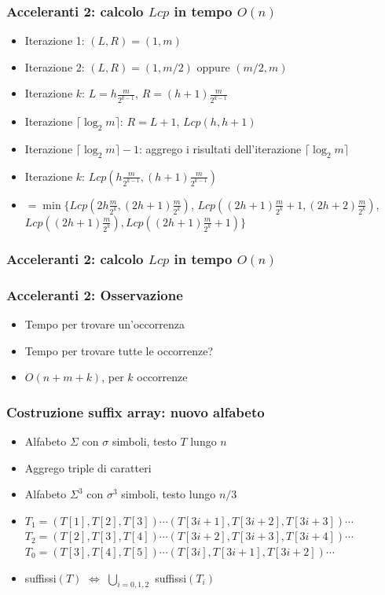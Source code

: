 \begin{frame}[fragile]
\frametitle{Acceleranti 2: calcolo $Lcp$ in tempo $O(n)$}
\begin{itemize}[<+->]
\item
Iterazione 1: $(L,R)=(1,m)$
\item
Iterazione 2: $(L,R)=(1,m/2)$ oppure $(m/2,m)$
\item
Iterazione $k$: $L = h\frac{m}{2^{k-1}}$, $R = (h+1)\frac{m}{2^{k-1}}$
\item
Iterazione $\lceil \log_{2}m\rceil$: $R=L+1$, $Lcp(h,h+1)$
\item
Iterazione $\lceil \log_{2}m\rceil -1$: aggrego i risultati dell'iterazione
$\lceil \log_{2}m\rceil$
\item
Iterazione $k$: $Lcp(h\frac{m}{2^{k-1}}, (h+1)\frac{m}{2^{k-1}})$
\item
$=\min\{Lcp(2h\frac{m}{2^{k}}, (2h+1)\frac{m}{2^{k}})$,
$Lcp((2h+1)\frac{m}{2^{k}}+1, (2h+2)\frac{m}{2^{k}})$,
$Lcp((2h+1)\frac{m}{2^{k}}), Lcp((2h+1)\frac{m}{2^{k}}+1)\}$
\end{itemize}
\end{frame}


\begin{frame}[fragile]
\frametitle{Acceleranti 2: calcolo $Lcp$ in tempo $O(n)$}
\end{frame}

\begin{frame}
\frametitle{Acceleranti 2: Osservazione}
\begin{itemize}[<+->]
\item
Tempo per trovare un'occorrenza
\item
Tempo per trovare tutte le occorrenze?
\item
$O(n+m+k)$, per $k$ occorrenze
\end{itemize}
\end{frame}

\begin{frame}
\frametitle{Costruzione suffix array: nuovo alfabeto}
\begin{itemize}
\item
Alfabeto $\Sigma$ con $\sigma$ simboli, testo $T$ lungo $n$
\item
Aggrego triple di caratteri
\item
Alfabeto $\Sigma^{3}$ con $\sigma^{3}$ simboli, testo lungo $n/3$
\item
$T_{1}=(T[1],T[2],T[3])\cdots (T[3i+1],T[3i+2],T[3i+3])\cdots$\\
$T_{2}=(T[2],T[3],T[4])\cdots (T[3i+2],T[3i+3],T[3i+4])\cdots$\\
$T_{0}=(T[3],T[4],T[5])\cdots (T[3i],T[3i+1],T[3i+2])\cdots$
\item
suffissi$(T)$ $\Leftrightarrow$ $\bigcup_{i=0,1,2}$ suffissi$(T_{i})$
\end{itemize}
\end{frame}

